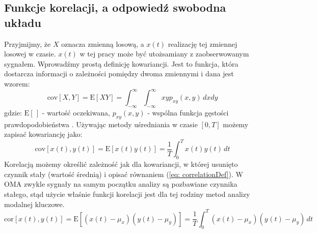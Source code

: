 \subsection{Funkcje korelacji, a odpowiedź swobodna układu} \label{sect: correlationFunction}
Przyjmijmy, że $X$ oznacza zmienną losową, a $x(t)$ realizację tej zmiennej losowej w czasie. $x(t)$ w tej pracy może być utożsamiany z zaobserwowanym sygnałem. Wprowadźmy prostą definicję kowariancji. Jest to funkcja, która dostarcza informacji o zależności pomiędzy dwoma zmiennymi i dana jest wzorem:
\begin{equation}
	\mathrm{cov}[X,Y] = \mathrm{E}[XY]=\int_{-\infty}^{\infty}\int_{-\infty}^{\infty}xyp_{xy}(x,y)\,dxdy
\end{equation}
gdzie: $\mathrm{E}[\,]$ - wartość oczekiwana, $p_{xy}(x,y)$ - wspólna funkcja gęstości prawdopodobieństwa . Używając metody uśredniania w czasie $[0,T]$ możemy zapisać kowariancję jako:
\begin{equation}
	\mathrm{cov}[x(t),y(t)] = \mathrm{E}[x(t)y(t)]=\frac{1}{T}\int_{0}^{T}x(t)y(t) \,dt
\end{equation}
Korelacją możemy określić zależność jak dla kowariancji, w której usunięto czynnik stały (wartość średnią) i opisać równaniem (\ref{eq: correlationDef}). W OMA zwykle sygnały na samym początku analizy są pozbawiane czynnika stałego, stąd użycie właśnie funkcji korelacji jest dla tej rodziny metod analizy modalnej kluczowe.
\begin{equation} \label{eq: correlationDef}
	\mathrm{cor}[x(t),y(t)] = \mathrm{E}[(x(t)-\mu_x)(y(t)-\mu_y)]=\frac{1}{T}\int_{0}^{T}(x(t)-\mu_x)(y_{}(t)-\mu_y) \,dt
\end{equation}


